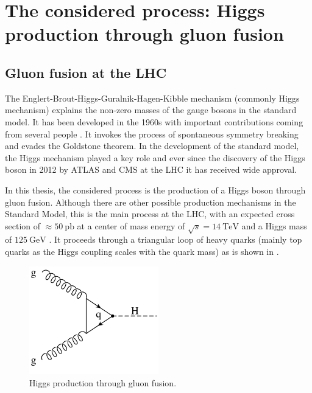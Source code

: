 
\chapter{The considered process: Higgs production through gluon fusion}
\label{ch:gfusion}
%
\section{Gluon fusion at the LHC}
The Englert-Brout-Higgs-Guralnik-Hagen-Kibble mechanism (commonly Higgs mechanism) explains the non-zero masses of the gauge bosons in the standard model.
It has been developed in the 1960s with important contributions coming from several people \cite{higgs1964a,higgs1964b,englert1964,guralnik1964,nambu1960,anderson1963}.
It invokes the process of spontaneous symmetry breaking and evades the Goldstone theorem.
In the development of the standard model, the Higgs mechanism played a key role and ever since the discovery of the Higgs boson in 2012 by ATLAS \cite{higgsdiscovery_atlas2012} and CMS \cite{higgsdiscovery_cms2012} at the LHC it has received wide approval.

In this thesis, the considered process is the production of a Higgs boson through gluon fusion.
Although there are other possible production mechanisms in the Standard Model, this is the main process at the LHC, with an expected cross section of $\approx \SI{50}{\pico\barn}$ at a center of mass energy of $\sqrt{s} = \SI{14}{\tera\electronvolt}$ and a Higgs mass of $\SI{125}{\giga\electronvolt}$ \cite{higgshandbook1}.
It proceeds through a triangular loop of heavy quarks (mainly top quarks as the Higgs coupling scales with the quark mass) as is shown in .
%
\begin{figure}[]
	\includegraphics[width=0.5\textwidth]{images/gluonfusion.pdf}
	\caption{Higgs production through gluon fusion.}
	\label{fig:gluonfusion}
\end{figure}
%

